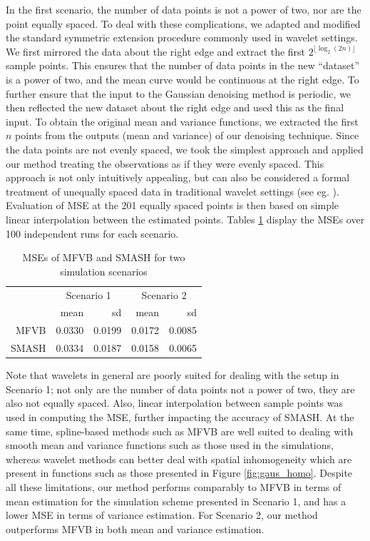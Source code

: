 \documentclass[12pt]{article}
\begin{document}
In the first scenario, the number of data points is not a power of two, nor are the point equally spaced. To deal with these complications, we adapted and modified the standard symmetric extension procedure commonly used in wavelet settings. We first mirrored the data about the right edge and extract the first $2^{\lfloor\log_2(2n)\rfloor}$ sample points. This ensures that the number of data points in the new ``dataset'' is a power of two, and the mean curve would be continuous at the right edge. To further ensure that the input to the Gaussian denoising method is periodic, we then reflected the new dataset about the right edge and used this as the final input. To obtain the original mean and variance functions, we extracted the first $n$ points from the outputs (mean and variance) of our denoising technique. Since the data points are not evenly spaced, we took the simplest approach and applied our method treating the observations as if they were evenly spaced. This approach is not only intuitively appealing, but can also be considered a formal treatment of unequally spaced data in traditional wavelet settings (see eg. \cite{Sardy1999Wavelet}). Evaluation of MSE at the 201 equally spaced points is then based on simple linear interpolation between the estimated points. Tables \ref{table:mfvb_comp} display the MSEs over 100 independent runs for each scenario.
\begin{table}[ht]
\centering
\begin{tabular}{rrrrr}
\hline
& \multicolumn{2}{c}{Scenario 1}&\multicolumn{2}{c}{Scenario 2}\\
\cline{2-5}
& mean & sd & mean & sd \\
\hline
MFVB & 0.0330 & 0.0199 & 0.0172 & 0.0085 \\
SMASH & 0.0334 & 0.0187 & 0.0158 & 0.0065 \\
\hline
\end{tabular}
\caption{MSEs of MFVB and SMASH for two simulation scenarios}
\label{table:mfvb_comp}
\end{table}

Note that wavelets in general are poorly suited for dealing with the setup in Scenario 1; not only are the number of data points not a power of two, they are also not equally spaced. Also, linear interpolation between sample points was used in computing the MSE, further impacting the accuracy of SMASH. At the same time, spline-based methods such as MFVB are well suited to dealing with smooth mean and variance functions such as those used in the simulations, whereas wavelet methods can better deal with spatial inhomogeneity which are present in functions such as those presented in Figure \ref{fig:gaus_homo}. Despite all these limitations, our method performs comparably to MFVB in terms of mean estimation for the simulation scheme presented in Scenario 1, and has a lower MSE in terms of variance estimation. For Scenario 2, our method outperforms MFVB in both mean and variance estimation. 
\end{document}
